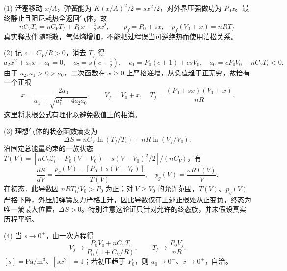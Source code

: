 (1) 活塞移动 \(x/A\)，弹簧能为 \(K(x/A)^2/2=sx^2/2\)，对外界压强做功为 \(P_0x\)。最终静止且阻尼耗热全返回气体，故
\[
nC_VT_i=nC_VT_f+P_0x+\tfrac12sx^2,\qquad
p_f=P_0+sx,\quad p_f(V_0+x)=nRT_f.
\]
真实释放伴随耗散，气体熵增加，不能把过程误当可逆绝热而使用泊松关系。

(2) 记 \(c=C_V/R>0\)，消去 \(T_f\) 得
\[
a_2x^2+a_1x+a_0=0,\quad
a_2=s(c+\tfrac12),\quad a_1=P_0(c+1)+csV_0,\quad a_0=cP_0V_0-nC_VT_i<0.
\]
由于 \(a_2,a_1>0>a_0\)，二次函数在 \(x\ge0\) 上严格递增，从负值趋于正无穷，故恰有一个正根
\[
x=\frac{-2a_0}{a_1+\sqrt{a_1^2-4a_2a_0}},\qquad V_f=V_0+x,\quad T_f=\frac{(P_0+sx)(V_0+x)}{nR}.
\]
这里将求根公式有理化以避免数值上的相消。

(3) 理想气体的状态函数熵变为
\[
\Delta S=nC_V\ln(T_f/T_i)+nR\ln(V_f/V_0).
\]
沿固定总能量约束的一族状态 \(T(V)=[nC_VT_i-P_0(V-V_0)-s(V-V_0)^2/2]/(nC_V)\)，有
\[
\frac{dS}{dV}=\frac{p_g(V)-[P_0+s(V-V_0)]}{T(V)},\quad p_g(V)=\frac{nRT(V)}{V}.
\]
在初态，此导数因 \(nRT_i/V_0>P_0\) 为正；对 \(V\ge V_0\) 的允许范围，\(T(V)\)、\(p_g(V)\) 严格下降，外压加弹簧反力严格上升，因此导数仅在上述正根处从正变负，终态为唯一熵最大位置，\(\Delta S>0\)。特别注意这论证只针对允许的终态族，并未假设真实历程平衡。

(4) 当 \(s\to0^+\)，由一次方程得
\[
V_f\to\frac{P_0V_0+nC_VT_i}{P_0(1+C_V/R)},\qquad T_f\to\frac{P_0V_f}{nR}.
\]
\([s]=\mathrm{Pa/m^3}\)、\([sx^2]=\mathrm J\)；若初压趋于 \(P_0\)，则 \(a_0\to0^-\)、\(x\to0^+\)，自洽。
